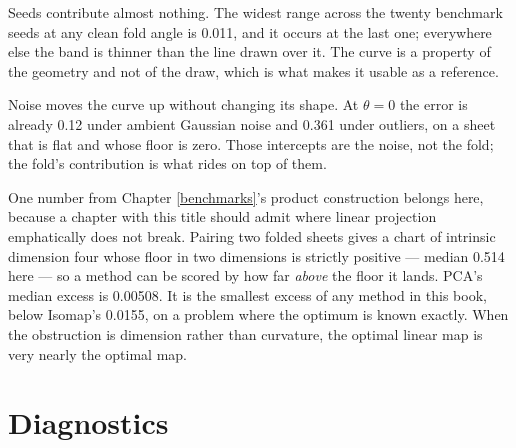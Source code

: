 \documentclass[
  british,
  a4paper,
]{book}
\newenvironment{Shaded}{\begin{snugshade}}{\end{snugshade}}
\newcommand{\FunctionTok}[1]{\textcolor[rgb]{0.13,0.29,0.53}{\textbf{#1}}}
\newcommand{\NormalTok}[1]{#1}
\newcommand{\OtherTok}[1]{\textcolor[rgb]{0.56,0.35,0.01}{#1}}
\newcommand{\SpecialCharTok}[1]{\textcolor[rgb]{0.81,0.36,0.00}{\textbf{#1}}}
\newcommand{\StringTok}[1]{\textcolor[rgb]{0.31,0.60,0.02}{#1}}
\begin{document}
Seeds contribute almost nothing. The widest range across the twenty benchmark
seeds at any clean fold angle is 0.011, and it occurs at the last
one; everywhere else the band is thinner than the line drawn over it. The curve
is a property of the geometry and not of the draw, which is what makes it usable
as a reference.

Noise moves the curve up without changing its shape. At \(\theta = 0\) the error is
already 0.12 under ambient Gaussian noise and
0.361 under outliers, on a sheet that is flat and whose
floor is zero. Those intercepts are the noise, not the fold; the fold's
contribution is what rides on top of them.

\begin{Shaded}
\end{Shaded}

One number from Chapter \ref{benchmarks}'s product construction belongs here,
because a chapter with this title should admit where linear projection
emphatically does not break. Pairing two folded sheets gives a chart of intrinsic
dimension four whose floor in two dimensions is strictly positive --- median
0.514 here --- so a method can be scored by how far
\emph{above} the floor it lands. PCA's median excess is
0.00508. It is the smallest excess
of any method in this book, below Isomap's
0.0155, on a problem where the
optimum is known exactly. When the obstruction is dimension rather than
curvature, the optimal linear map is very nearly the optimal map.

\section{Diagnostics}\label{lin-diagnostics}
\end{document}
